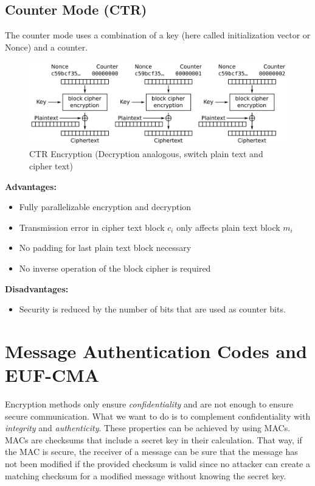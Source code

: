 \subsection{Counter Mode (CTR)}

The counter mode uses a combination of a key (here called initialization vector or Nonce) and a counter.

\begin{figure}[h]
    \center
    \includegraphics[width=\linewidth]{gfx/enc_ctr.png}
    \caption{CTR Encryption (Decryption analogous, switch plain text and cipher text)}
    \label{fig:ctr_enc}
\end{figure}

\textbf{Advantages:}

\begin{itemize}
    \item Fully parallelizable encryption and decryption
    \item Transmission error in cipher text block $c_i$ only affects plain text block $m_i$
    \item No padding for last plain text block necessary
    \item No inverse operation of the block cipher is required
\end{itemize}

\textbf{Disadvantages:}

\begin{itemize}
    \item Security is reduced by the number of bits that are used as counter bits.
\end{itemize}

\section{Message Authentication Codes and EUF-CMA}

Encryption methods only ensure \emph{confidentiality} and are not enough to ensure secure communication. What we want to do is to complement confidentiality with \emph{integrity} and \emph{authenticity}. These properties can be achieved by using \acp{MAC}. \acp{MAC} are checksums that include a secret key in their calculation. That way, if the \ac{MAC} is secure, the receiver of a message can be sure that the message has not been modified if the provided checksum is valid since no attacker can create a matching checksum for a modified message without knowing the secret key.

